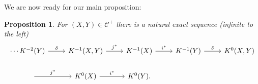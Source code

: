 \documentclass[leqno]{book}
\numberwithin{equation}{section}
\newtheorem{proposition}[theorem]{Proposition}
\theoremstyle{definition}
\begin{document}
            We are now ready for our main proposition:
            \begin{proposition}
              For $(X,Y)\in \mathcal{C}^{+}$ there is a natural exact sequence (infinite to the left)
              \begin{equation*}
                \begin{tikzcd}
                  \cdots K^{-2}(Y) \arrow[r, "\delta"] & K^{-1}(X,Y) \arrow [r, "j^{*}"] & K^{-1}(X) \arrow[r, "i^{*}"] & K^{-1}(Y) \arrow [r, "\delta"]  & K^{0}(X,Y)\\
                  \quad \arrow[r, "j^{*}"] & K^{0}(X) \arrow[r, "i^{*}"] & K^{0}(Y).
                \end{tikzcd}
              \end{equation*}
            \end{proposition}
\end{document}
